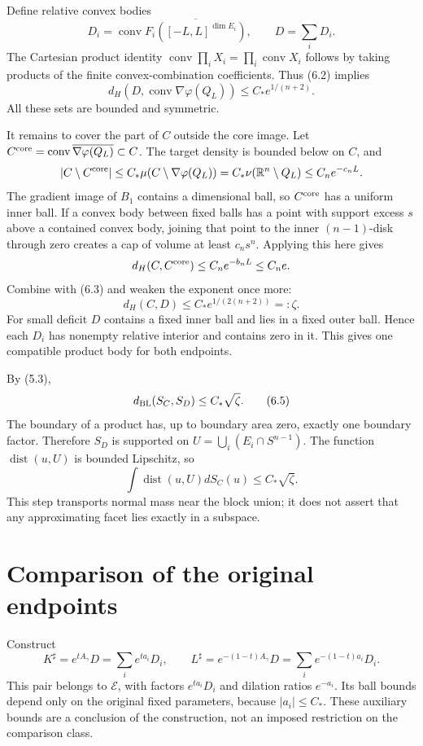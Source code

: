 \documentclass[11pt,reqno]{amsart}
\numberwithin{equation}{section}
\theoremstyle{remark}
\theoremstyle{definition}
\begin{document}
Define relative convex bodies
\[
D_i=\operatorname{conv}\overline{F_i([-L,L]^{\dim E_i})},\qquad
D=\sum_iD_i.
\]
The Cartesian product identity
\(\operatorname{conv}\prod_i X_i=\prod_i\operatorname{conv}X_i\)
follows by taking products of the finite convex-combination coefficients. Thus (6.2) implies
\[
d_H\!\left(D,\operatorname{conv}\nabla\varphi(Q_L)\right)
\le C_* e^{1/(n+2)}.                                    \tag{6.3}
\]
All these sets are bounded and symmetric.

It remains to cover the part of \(C\) outside the core image. Let
\(C^{\rm core}=\operatorname{conv}\overline{\nabla\varphi(Q_L)}\subset C\).
The target density is bounded below on \(C\), and
\[
|C\setminus C^{\rm core}|
\le C_*\mu(C\setminus\nabla\varphi(Q_L))
=C_*\nu(\mathbb R^n\setminus Q_L)\le C_ne^{-c_nL}.
\]
The gradient image of \(B_1\) contains a dimensional ball, so \(C^{\rm core}\) has a uniform inner ball. If a convex body between fixed balls has a point with support excess \(s\) above a contained convex body, joining that point to the inner \((n-1)\)-disk through zero creates a cap of volume at least \(c_ns^n\). Applying this here gives
\[
d_H(C,C^{\rm core})\le C_ne^{-b_nL}\le C_ne.
\]
Combine with (6.3) and weaken the exponent once more:
\[
\boxed{\ d_H(C,D)\le C_*e^{1/(2(n+2))}=:\zeta.\ }       \tag{6.4}
\]
For small deficit \(D\) contains a fixed inner ball and lies in a fixed outer ball. Hence each \(D_i\) has nonempty relative interior and contains zero in it. This gives one compatible product body for both endpoints.

By (5.3),
\[
d_{\rm BL}(S_C,S_D)\le C_*\sqrt\zeta.                   \tag{6.5}
\]
The boundary of a product has, up to boundary area zero, exactly one boundary factor. Therefore \(S_D\) is supported on
\(U=\bigcup_i(E_i\cap S^{n-1})\).
The function \(\operatorname{dist}(u,U)\) is bounded Lipschitz, so
\[
\int\operatorname{dist}(u,U)dS_C(u)\le C_*\sqrt\zeta.   \tag{6.6}
\]
This step transports normal mass near the block union; it does not assert that any approximating facet lies exactly in a subspace.

\section{Comparison of the original endpoints}

Construct
\[
K^\sharp=e^{tA_\gamma}D=\sum_i e^{ta_i}D_i,\qquad
L^\sharp=e^{-(1-t)A_\gamma}D=\sum_i e^{-(1-t)a_i}D_i.    \tag{7.1}
\]
This pair belongs to \(\mathcal E\), with factors \(e^{ta_i}D_i\) and dilation ratios \(e^{-a_i}\). Its ball bounds depend only on the original fixed parameters, because \(|a_i|\le C_*\). These auxiliary bounds are a conclusion of the construction, not an imposed restriction on the comparison class.
\end{document}
